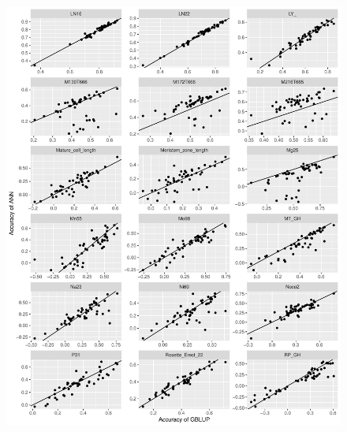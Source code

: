 \begin{figure}[H]
  \centering \includegraphics[height=1.05\textheight, width=1.1\textwidth]{Figures/cor_plots_5}
  \decoRule
 \label{fig:bla}
\end{figure}

